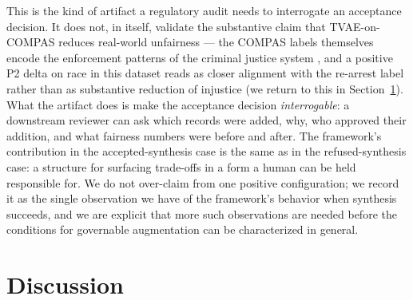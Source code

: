 \documentclass[11pt]{article}
\begin{document}
This is the kind of artifact a regulatory audit needs to interrogate an acceptance decision. It does not, in itself, validate the substantive claim that TVAE-on-COMPAS reduces real-world unfairness --- the COMPAS labels themselves encode the enforcement patterns of the criminal justice system \cite{Bao2021}, and a positive P2 delta on race in this dataset reads as closer alignment with the re-arrest label rather than as substantive reduction of injustice (we return to this in Section~\ref{sec:discussion}). What the artifact does is make the acceptance decision \emph{interrogable}: a downstream reviewer can ask which records were added, why, who approved their addition, and what fairness numbers were before and after. The framework's contribution in the accepted-synthesis case is the same as in the refused-synthesis case: a structure for surfacing trade-offs in a form a human can be held responsible for. We do not over-claim from one positive configuration; we record it as the single observation we have of the framework's behavior when synthesis succeeds, and we are explicit that more such observations are needed before the conditions for governable augmentation can be characterized in general.

\section{Discussion}
\label{sec:discussion}
\end{document}
